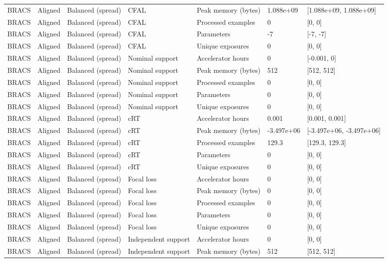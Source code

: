 \begin{longtable}{lllllll}
BRACS & Aligned & Balanced (spread) & CFAL & Peak memory (bytes) & 1.088e+09 & [1.088e+09, 1.088e+09] \\
BRACS & Aligned & Balanced (spread) & CFAL & Processed examples & 0 & [0, 0] \\
BRACS & Aligned & Balanced (spread) & CFAL & Parameters & -7 & [-7, -7] \\
BRACS & Aligned & Balanced (spread) & CFAL & Unique exposures & 0 & [0, 0] \\
BRACS & Aligned & Balanced (spread) & Nominal support & Accelerator hours & 0 & [-0.001, 0] \\
BRACS & Aligned & Balanced (spread) & Nominal support & Peak memory (bytes) & 512 & [512, 512] \\
BRACS & Aligned & Balanced (spread) & Nominal support & Processed examples & 0 & [0, 0] \\
BRACS & Aligned & Balanced (spread) & Nominal support & Parameters & 0 & [0, 0] \\
BRACS & Aligned & Balanced (spread) & Nominal support & Unique exposures & 0 & [0, 0] \\
BRACS & Aligned & Balanced (spread) & cRT & Accelerator hours & 0.001 & [0.001, 0.001] \\
BRACS & Aligned & Balanced (spread) & cRT & Peak memory (bytes) & -3.497e+06 & [-3.497e+06, -3.497e+06] \\
BRACS & Aligned & Balanced (spread) & cRT & Processed examples & 129.3 & [129.3, 129.3] \\
BRACS & Aligned & Balanced (spread) & cRT & Parameters & 0 & [0, 0] \\
BRACS & Aligned & Balanced (spread) & cRT & Unique exposures & 0 & [0, 0] \\
BRACS & Aligned & Balanced (spread) & Focal loss & Accelerator hours & 0 & [0, 0] \\
BRACS & Aligned & Balanced (spread) & Focal loss & Peak memory (bytes) & 0 & [0, 0] \\
BRACS & Aligned & Balanced (spread) & Focal loss & Processed examples & 0 & [0, 0] \\
BRACS & Aligned & Balanced (spread) & Focal loss & Parameters & 0 & [0, 0] \\
BRACS & Aligned & Balanced (spread) & Focal loss & Unique exposures & 0 & [0, 0] \\
BRACS & Aligned & Balanced (spread) & Independent support & Accelerator hours & 0 & [0, 0] \\
BRACS & Aligned & Balanced (spread) & Independent support & Peak memory (bytes) & 512 & [512, 512] \\

\end{longtable}
